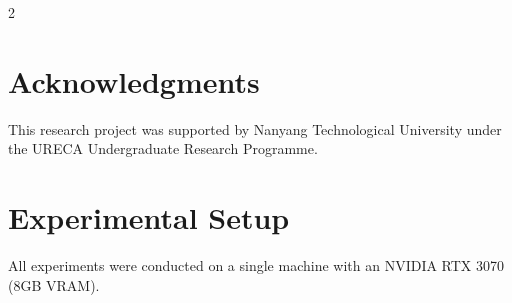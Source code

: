 \documentclass[a4paper,10pt]{article}
\begin{document}
\begin{multicols*}{2}
\newpage
\section*{Acknowledgments}
This research project was supported by Nanyang Technological University under the URECA Undergraduate Research Programme. 

 


\newpage
\appendix
\label{sec:appendix_main}
\section{Experimental Setup}
All experiments were conducted on a single machine with an NVIDIA RTX 3070 (8GB VRAM). 


\end{multicols*}
\end{document}
